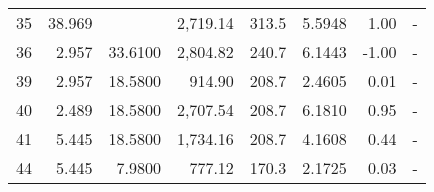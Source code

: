 \documentclass[]{article}
\newcommand{\bftab}{\fontseries{b}\selectfont}
\begin{document}
\begin{longtable}[H]{lrrrrrrr}
35    &                                                    38.969 &                                    \bftab 103.4200 &                   2,719.14 &                                                      313.5 &                      5.5948 &                                                        1.00 &                                                                                           - \\
36    &                                                     2.957 &                                            33.6100 &                   2,804.82 &                                                      240.7 &                      6.1443 &                                                       -1.00 &                                                                                           - \\
39    &                                                     2.957 &                                            18.5800 &                     914.90 &                                                      208.7 &                      2.4605 &                                                        0.01 &                                                                                           - \\
40    &                                                     2.489 &                                            18.5800 &                   2,707.54 &                                                      208.7 &                      6.1810 &                                                        0.95 &                                                                                           - \\
41    &                                                     5.445 &                                            18.5800 &                   1,734.16 &                                                      208.7 &                      4.1608 &                                                        0.44 &                                                                                           - \\
44    &                                                     5.445 &                                             7.9800 &                     777.12 &                                                      170.3 &                      2.1725 &                                                        0.03 &                                                                                           - \\

\end{longtable}
\end{document}
